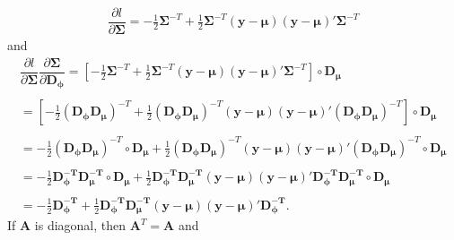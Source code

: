 \documentclass[useAMS,referee]{biom}
\begin{document}
\begin{equation}
\begin{array}{l}
\dfrac{\partial l}{\partial \boldsymbol{\Sigma}} = -\frac{1}{2}\boldsymbol{\Sigma}^{-T}+\frac{1}{2}\boldsymbol{\Sigma}^{-T}(\mathbf{y}-\boldsymbol{\mu})(\mathbf{y}-\boldsymbol{\mu})'\boldsymbol{\Sigma}^{-T}

\end{array}
\end{equation}
and
\begin{equation*}
\begin{array}{l}
\dfrac{\partial l}{\partial \boldsymbol{\Sigma}} \dfrac{\partial \boldsymbol{\Sigma}}{\partial \mathbf{D_\phi}}= \left[-\frac{1}{2}\boldsymbol{\Sigma}^{-T}+\frac{1}{2}\boldsymbol{\Sigma}^{-T}(\mathbf{y}-\boldsymbol{\mu})(\mathbf{y}-\boldsymbol{\mu})'\boldsymbol{\Sigma}^{-T}\right] \circ \mathbf{D_\mu}\\~\\

= \left[-\frac{1}{2}\mathbf{(D_\phi D_\mu)}^{-T}+\frac{1}{2}\mathbf{(D_\phi D_\mu)}^{-T}(\mathbf{y}-\boldsymbol{\mu})(\mathbf{y}-\boldsymbol{\mu})'\mathbf{(D_\phi D_\mu)}^{-T}\right] \circ \mathbf{D_\mu}\\~\\

= -\frac{1}{2}\mathbf{(D_\phi D_\mu)}^{-T}\circ\mathbf{D_\mu}+\frac{1}{2}\mathbf{(D_\phi D_\mu)}^{-T}(\mathbf{y}-\boldsymbol{\mu})(\mathbf{y}-\boldsymbol{\mu})'\mathbf{(D_\phi D_\mu)}^{-T}\circ\mathbf{D_\mu} \\~\\

= -\frac{1}{2}\mathbf{ D_\phi^{-T}D_\mu^{-T}}\circ\mathbf{D_\mu}+\frac{1}{2}\mathbf{ D_\phi^{-T}D_\mu^{-T}}(\mathbf{y}-\boldsymbol{\mu})(\mathbf{y}-\boldsymbol{\mu})'\mathbf{ D_\phi^{-T}D_\mu^{-T}}\circ\mathbf{D_\mu} \\~\\

= -\frac{1}{2}\mathbf{ D_\phi^{-T}}+\frac{1}{2}\mathbf{ D_\phi^{-T}D_\mu^{-T}}(\mathbf{y}-\boldsymbol{\mu})(\mathbf{y}-\boldsymbol{\mu})'\mathbf{ D_\phi^{-T}}.

\end{array}
\end{equation*}
If \textbf{A} is diagonal, then $\textbf{A}^T = \textbf{A}$ and
\end{document}
